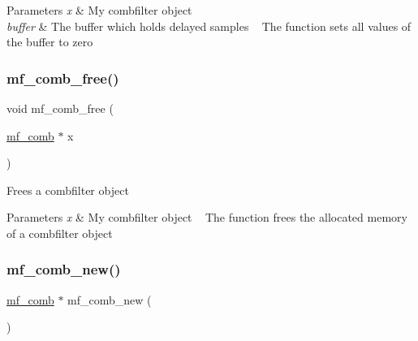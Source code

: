 \begin{DoxyParams}{Parameters}
{\em x} & My combfilter object ~\newline
 \\
\hline
{\em buffer} & The buffer which holds delayed samples ~\newline
 The function sets all values of the buffer to zero ~\newline
 \\
\hline
\end{DoxyParams}
\mbox{\label{structmf__comb_a5d57df59f3de97be0e53bd7393fe4f80}} 
\subsubsection{\texorpdfstring{mf\+\_\+comb\+\_\+free()}{mf\_comb\_free()}}
{\footnotesize\ttfamily void mf\+\_\+comb\+\_\+free (\begin{DoxyParamCaption}\item[{\mbox{\hyperlink{structmf__comb}{mf\+\_\+comb}} $\ast$}]{x }\end{DoxyParamCaption})\hspace{0.3cm}{\ttfamily [related]}}



Frees a combfilter object~\newline
 


\begin{DoxyParams}{Parameters}
{\em x} & My combfilter object ~\newline
 The function frees the allocated memory~\newline
 of a combfilter object \\
\hline
\end{DoxyParams}
\mbox{\label{structmf__comb_ad61343b3898251b638559616946d0fc5}} 
\subsubsection{\texorpdfstring{mf\+\_\+comb\+\_\+new()}{mf\_comb\_new()}}
{\footnotesize\ttfamily \mbox{\hyperlink{structmf__comb}{mf\+\_\+comb}} $\ast$ mf\+\_\+comb\+\_\+new (\begin{DoxyParamCaption}{ }\end{DoxyParamCaption})\hspace{0.3cm}{\ttfamily [related]}}



